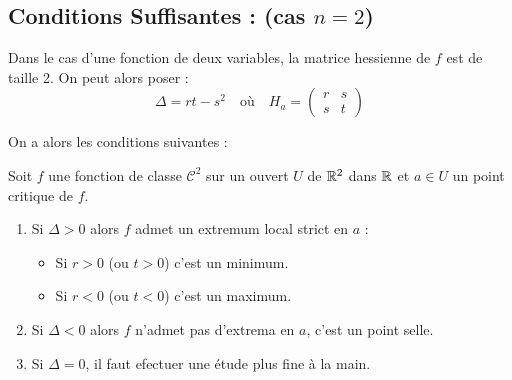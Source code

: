 \subsection{Conditions Suffisantes : (cas $n = 2$)}

Dans le cas d'une fonction de deux variables, la matrice hessienne de $f$ est de taille 2. 
On peut alors poser : 
    \[ 
        \Delta = rt - s^2    
        \quad \text{où} \quad H_a = 
            \begin{pmatrix}
                r & s \\ 
                s & t 
            \end{pmatrix}
    \] 

On a alors les conditions suivantes : 

\begin{theorem}[Conditions Suffisantes (cas $n = 2$)]
    Soit $f$ une fonction de classe $ \mathcal{C}^2$ sur un ouvert $U$ de $\mathbb{R}^2$ dans $\mathbb{R}$ 
    et $a \in U$ un point critique de $f$. 
    \begin{enumerate}
        \item Si $\Delta > 0$ alors $f$ admet un extremum local strict en $a$ : 
            \begin{itemize}
                \item Si $r > 0$ (ou $t > 0$) c'est un minimum. 
                \item Si $r < 0$ (ou $t < 0$) c'est un maximum. 
            \end{itemize}
        \item Si $\Delta < 0$ alors $f$ n'admet pas d'extrema en $a$, c'est un point selle. 
        \item Si $\Delta = 0$, il faut efectuer une étude plus fine à la main. 
    \end{enumerate}
\end{theorem}


